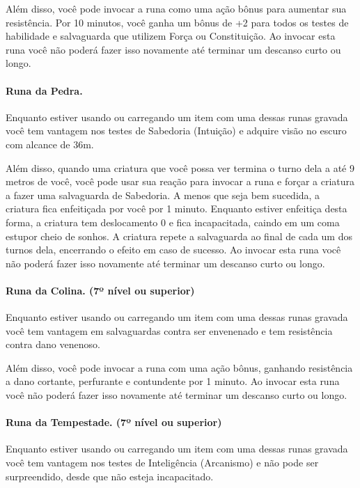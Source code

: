 \begin{multicols}{2}
Além disso, você pode invocar a runa como uma ação bônus para aumentar sua
resistência. Por 10 minutos, você ganha um bônus de +2 para todos os testes de
habilidade e salvaguarda que utilizem Força ou Constituição. Ao invocar esta
runa você não poderá fazer isso novamente até terminar um descanso curto ou
longo.

\paragraph{Runa da Pedra.}%

Enquanto estiver usando ou carregando um item com uma dessas runas gravada você
tem vantagem nos testes de Sabedoria (Intuição) e adquire visão no escuro com
alcance de 36m.

Além disso, quando uma criatura que você possa ver termina o turno dela a até 9
metros de você, você pode usar sua reação para invocar a runa e forçar a
criatura a fazer uma salvaguarda de Sabedoria. A menos que seja bem sucedida, a
criatura fica enfeitiçada por você por 1 minuto. Enquanto estiver enfeitiça
desta forma, a criatura tem deslocamento 0 e fica incapacitada, caindo em um
coma estupor cheio de sonhos. A criatura repete a salvaguarda ao final de cada
um dos turnos dela, encerrando o efeito em caso de sucesso. Ao invocar esta runa
você não poderá fazer isso novamente até terminar um descanso curto ou longo.

\paragraph{Runa da Colina. (7º nível ou superior)}%

Enquanto estiver usando ou carregando um item com uma dessas runas gravada você
tem vantagem em salvaguardas contra ser envenenado e tem resistência contra dano
venenoso.

Além disso, você pode invocar a runa com uma ação bônus, ganhando resistência a
dano cortante, perfurante e contundente por 1 minuto. Ao invocar esta runa você
não poderá fazer isso novamente até terminar um descanso curto ou longo.

\paragraph{Runa da Tempestade. (7º nível ou superior)}%

Enquanto estiver usando ou carregando um item com uma dessas runas gravada você
tem vantagem nos testes de Inteligência (Arcanismo) e não pode ser surpreendido,
desde que não esteja incapacitado.


\end{multicols}
